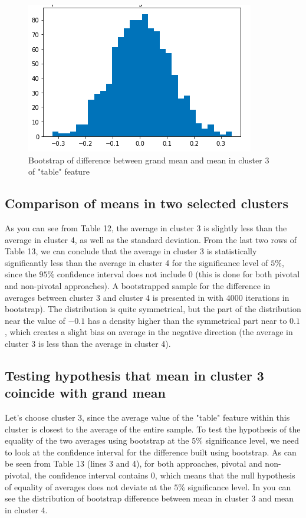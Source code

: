 \documentclass[12pt,a4paper]{article}
\begin{document}
	\begin{figure}[h]
		\centering
		\includegraphics[width=.8\textwidth]{media/grand_mean_cluster_3.png}
		\caption{Bootstrap of difference between grand mean and mean in cluster 3 of "table" feature}
		\label{fig:grand_mean_cluster3_bootstrup}
	\end{figure}
	
	\subsection{Comparison of means in two selected clusters}
	
	As you can see from Table 12, the average in cluster 3 is slightly less than the average in cluster 4, as well as the standard deviation. From the last two rows of Table 13, we can conclude that the average in cluster 3 is statistically significantly less than the average in cluster 4 for the significance level of $5\%$, since the $95\%$ confidence interval does not include $0$ (this is done for both pivotal and non-pivotal approaches). A bootstrapped sample for the difference in averages between cluster 3 and cluster 4 is presented in  with 4000 iterations in bootstrap). The distribution is quite symmetrical, but the part of the distribution near the value of $-0.1$ has a density higher than the symmetrical part near to $0.1$, which creates a slight bias on average in the negative direction (the average in cluster 3 is less than the average in cluster 4).
	
	\subsection{Testing hypothesis that mean in cluster 3 coincide with grand mean}
	
	Let's choose cluster 3, since the average value of the "table" feature within this cluster is closest to the average of the entire sample. To test the hypothesis of the equality of the two averages using bootstrap at the $5\%$ significance level, we need to look at the confidence interval for the difference built using bootstrap. As can be seen from Table 13 (lines 3 and 4), for both approaches, pivotal and non-pivotal, the confidence interval contains $0$, which means that the null hypothesis of equality of averages does not deviate at the $5\%$ significance level. In  you can see the distribution of bootstrap difference between mean in cluster 3 and mean in cluster 4.
	
\end{document}
